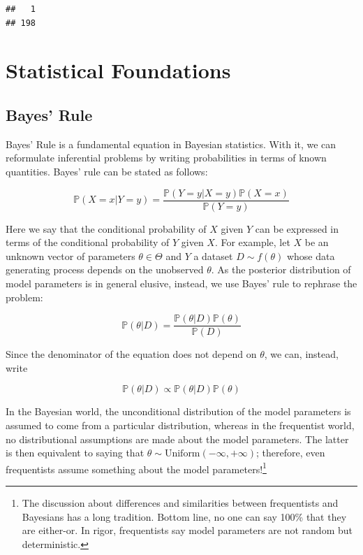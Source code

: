 \documentclass[]{book}
\begin{document}
\begin{verbatim}
##   1 
## 198
\end{verbatim}

\hypertarget{part-statistical-foundations}{%
\part{Statistical Foundations}\label{part-statistical-foundations}}

\hypertarget{bayes-rule}{%
\chapter{Bayes' Rule}\label{bayes-rule}}

Bayes' Rule is a fundamental equation in Bayesian statistics. With it, we can reformulate inferential problems by writing probabilities in terms of known quantities. Bayes' rule can be stated as follows:

\begin{equation}
\mathbb{P}{\left(X=x|Y=y\right)} = \frac{\mathbb{P}{\left(Y=y|X=y\right)}\mathbb{P}{\left(X=x\right)}}{\mathbb{P}{\left(Y=y\right)}}
\end{equation}

Here we say that the conditional probability of \(X\) given \(Y\) can be expressed in terms of the conditional probability of \(Y\) given \(X\). For example, let \(X\) be an unknown vector of parameters \(\theta\in\Theta\) and \(Y\) a dataset \(D \sim f(\theta)\) whose data generating process depends on the unobserved \(\theta\). As the posterior distribution of model parameters is in general elusive, instead, we use Bayes' rule to rephrase the problem:

\begin{equation*}
\mathbb{P}{\left(\theta|D\right)} = \frac{\mathbb{P}{\left(\theta|D\right)}\mathbb{P}{\left(\theta\right)}}{\mathbb{P}{\left(D\right)}}
\end{equation*}

Since the denominator of the equation does not depend on \(\theta\), we can, instead, write

\begin{equation*}
\mathbb{P}{\left(\theta|D\right)} \propto \mathbb{P}{\left(\theta|D\right)}\mathbb{P}{\left(\theta\right)}
\end{equation*}

In the Bayesian world, the unconditional distribution of the model parameters is assumed to come from a particular distribution, whereas in the frequentist world, no distributional assumptions are made about the model parameters. The latter is then equivalent to saying that \(\theta\sim \mbox{Uniform}(-\infty, +\infty)\); therefore, even frequentists assume something about the model parameters!\footnote{The discussion about differences and similarities between frequentists and Bayesians has a long tradition. Bottom line, no one can say 100\% that they are either-or. In rigor, frequentists say model parameters are not random but deterministic.}
\end{document}
